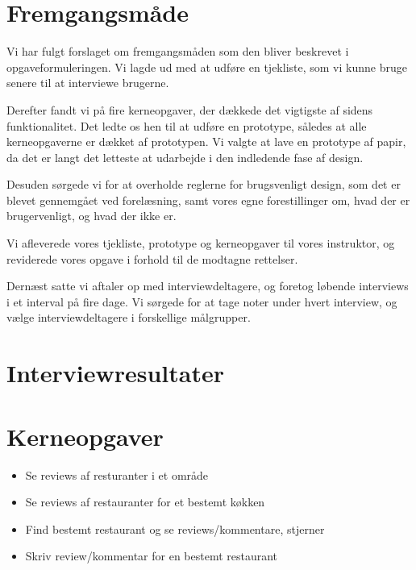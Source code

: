 \documentclass[a4paper, 12pt]{article}
\begin{document}

\newpage
\setcounter{page}{1}
\fancyfoot[C]{\thepage}

\section{Fremgangsmåde}
\label{sec:Fremgangsmaade}

Vi har fulgt forslaget om fremgangsmåden som den bliver beskrevet i
opgaveformuleringen. Vi lagde ud med at udføre en tjekliste, som vi kunne bruge
senere til at interviewe brugerne.

Derefter fandt vi på fire kerneopgaver, der dækkede det vigtigste af sidens
funktionalitet. Det ledte os hen til at udføre en prototype, således at alle
kerneopgaverne er dækket af prototypen. Vi valgte at lave en prototype af papir,
da det er langt det letteste at udarbejde i den indledende fase af design.

Desuden sørgede vi for at overholde reglerne for brugsvenligt design, som det er
blevet gennemgået ved forelæsning, samt vores egne forestillinger om, hvad der
er brugervenligt, og hvad der ikke er.

Vi afleverede vores tjekliste, prototype og kerneopgaver til vores instruktor,
og reviderede vores opgave i forhold til de modtagne rettelser.

Dernæst satte vi aftaler op med interviewdeltagere, og foretog løbende
interviews i et interval på fire dage. Vi sørgede for at tage noter under hvert
interview, og vælge interviewdeltagere i forskellige målgrupper.

\section{Interviewresultater}
\label{sec:Interviewresultater}

\section{Kerneopgaver}
\label{sec:Kerneopgaver}
\begin{itemize}
\item Se reviews af resturanter i et område
\item Se reviews af restauranter for et bestemt køkken
\item Find bestemt restaurant og se reviews/kommentare, stjerner
\item Skriv review/kommentar for en bestemt restaurant
\end{itemize}
\end{document}
